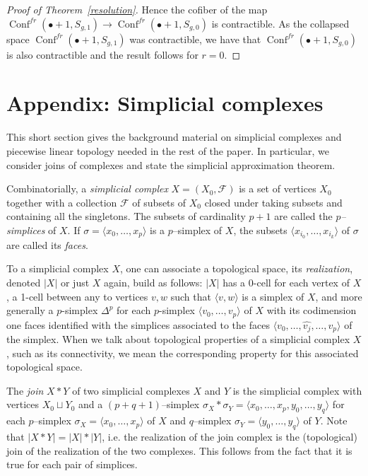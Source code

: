 \documentclass[10pt]{amsart}
\newcommand{\F}{\mathcal{F}}
\newcommand{\s}{\sigma}
\newcommand{\lgl}{\langle}
\newcommand{\rgl}{\rangle}
\newcommand{\Conf}{\operatorname{Conf}^{fr}}
\begin{document}
\begin{proof}[Proof of Theorem~\ref{resolution}]
Hence the cofiber of the map  $\Conf(\bullet+1,S_{g,1})\to \Conf(\bullet+1,S_{g,0})$ is contractible. As
the collapsed space $\Conf(\bullet+1,S_{g,1})$ was contractible, we have that $\Conf(\bullet+1,S_{g,0})$ is also 
contractible and the result follows for $r=0$. 
\end{proof}






\section{Appendix: Simplicial complexes}


This short section gives the background material on simplicial complexes and piecewise linear topology needed in the
rest of the paper. In particular, we consider joins of complexes and state the simplicial approximation theorem. 




\medskip

Combinatorially, a {\em simplicial complex} $X=(X_0,\F)$ is a set of vertices $X_0$ together with a collection $\F$ 
of subsets of $X_0$ closed under taking subsets and
containing all the singletons. The
subsets of cardinality $p+1$ are called the {\em $p$--simplices} of $X$. 
If $\s=\lgl x_0,\dots,x_p\rgl$ is a $p$--simplex of $X$, the subsets $\lgl x_{i_0},\dots,x_{i_k}\rgl$ of $\s$ are called its {\em
  faces}.  

To a simplicial complex $X$, one can associate a topological space, its {\em realization}, denoted $|X|$ or just $X$ again, build as
follows: $|X|$ has a 0-cell for each vertex of $X$, a 1-cell between any to vertices $v,w$ such that $\lgl v,w\rgl$ is a simplex of
$X$, and more generally a $p$-simplex $\Delta^p$ for each $p$-simplex $\lgl v_0,\dots,v_p\rgl$ of $X$ with its codimension one faces 
identified with the simplices associated to the faces $\lgl v_0,\dots,\widehat{v_j},\dots,v_p\rgl$ of the simplex. 
When we talk about topological properties of a simplicial complex $X$, such as its connectivity, we mean the corresponding
property for this associated topological space. 

\medskip

The {\em join} $X*Y$ of two simplicial complexes $X$ and $Y$ is the
simplicial complex with vertices $X_0\sqcup Y_0$ and a $(p+q+1)$--simplex 
$\s_X*\s_Y=\lgl x_0,\dots,x_p,y_0,\dots,y_q\rgl$ for each 
$p$--simplex $\s_X=\lgl x_0,\dots,x_p\rgl$  of $X$ and $q$--simplex $\s_Y=\lgl y_0,\dots,y_q\rgl$ of
$Y$. Note that $|X*Y|=|X|*|Y|$, i.e. the realization of the join complex is the (topological) join of the realization of the two
complexes. This follows from the fact that it is true for each pair of simplices. 
\end{document}

